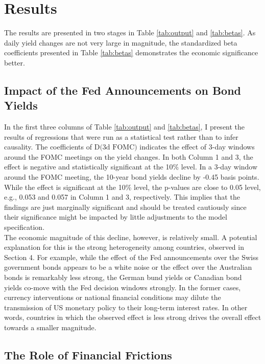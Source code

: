\section{Results}

The results are presented in two stages in Table \ref{tab:output} and \ref{tab:betas}. As daily yield changes are not very large in magnitude, the standardized beta coefficients presented in Table \ref{tab:betas} demonstrates the economic significance better.

\subsection{Impact of the Fed Announcements on Bond Yields}

In the first three columns of Table \ref{tab:output} and \ref{tab:betas}, I present the results of regressions that were run as a statistical test rather than to infer causality. The coefficients of $\textrm{D(3d FOMC})$ indicates the effect of 3-day windows around the FOMC meetings on the yield changes. In both Column 1 and 3, the effect is negative and statistically significant at the 10\% level. In a 3-day window around the FOMC meeting, the 10-year bond yields decline by -0.45 basis points. While the effect is significant at the 10\% level, the p-values are close to 0.05 level, e.g., 0.053 and 0.057 in Column 1 and 3, respectively. This implies that the findings are just marginally significant and should be treated cautiously since their significance might be impacted by little adjustments to the model specification. \\

The economic magnitude of this decline, however, is relatively small. A potential explanation for this is the strong heterogeneity among countries, observed in Section 4. For example, while the effect of the Fed announcements over the Swiss government bonds appears to be a white noise or the effect over the Australian bonds is remarkably less strong, the German bund yields or Canadian bond yields co-move with the Fed decision windows strongly. In the former cases, currency interventions or national financial conditions may dilute the transmission of US monetary policy to their long-term interest rates. In other words, countries in which the observed effect is less strong drives the overall effect towards a smaller magnitude.




\subsection{The Role of Financial Frictions}


